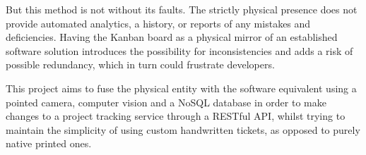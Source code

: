 \documentclass[12pt]{report}
\newcommand{\towrite}[1]{\todo[inline,color=yellow!10]{TO WRITE: #1}}
\newtheorem{theorem}{Theorem}[section]
\newtheorem{corollary}{Corollary}[theorem]
\theoremstyle{definition}
\newtheorem{definition}[theorem]{Definition}
\theoremstyle{remark}
\newtheorem*{remark}{Remark}
\begin{document}
But this method is not without its faults. The strictly physical presence does not provide automated analytics, a history, or reports of any mistakes and deficiencies. Having the Kanban board as a physical mirror of an established software solution introduces the possibility for inconsistencies and adds a risk of possible redundancy, which in turn could frustrate developers. 

This project aims to fuse the physical entity with the software equivalent using a pointed camera, computer vision and a NoSQL database in order to make changes to a project tracking service through a RESTful API, whilst trying to maintain the simplicity of using custom handwritten tickets, as opposed to purely native printed ones.

\tableofcontents
\listoffigures











\end{document}
